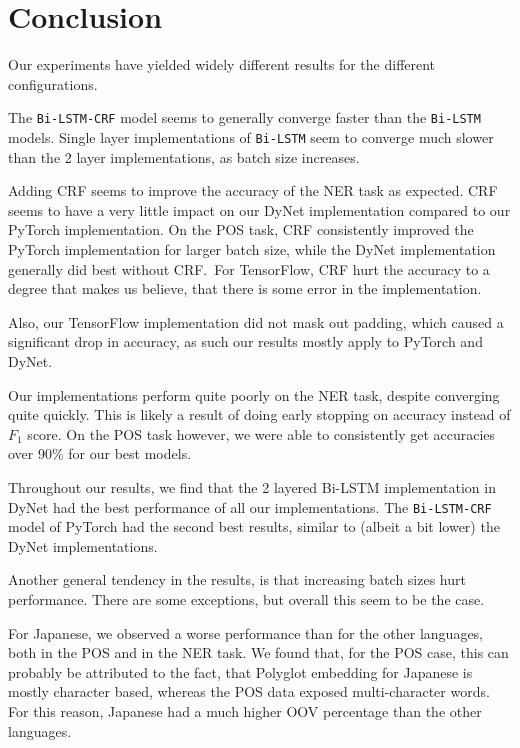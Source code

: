 

\section{Conclusion}

Our experiments have yielded widely different results for the different
configurations.

The \texttt{Bi-LSTM-CRF} model seems to generally converge faster than the
\texttt{Bi-LSTM} models. Single layer implementations of \texttt{Bi-LSTM}
seem to converge much slower than the 2 layer implementations, as batch size
increases.

Adding CRF seems to improve the accuracy of the NER task as expected. CRF seems
to have a very little impact on our DyNet implementation compared to our PyTorch
implementation. On the POS task, CRF consistently improved the PyTorch
implementation for larger batch size, while the DyNet implementation generally
did best without CRF.\ For TensorFlow, CRF hurt the accuracy to a degree that
makes us believe, that there is some error in the implementation.

Also, our TensorFlow implementation did not mask out padding, which caused a
significant drop in accuracy, as such our results mostly apply to PyTorch and
DyNet.

Our implementations perform quite poorly on the NER task, despite converging
quite quickly. This is likely a result of doing early stopping on accuracy
instead of $F_1$ score. On the POS task however, we were able to consistently
get accuracies over 90\% for our best models.

Throughout our results, we find that the 2 layered Bi-LSTM implementation in
DyNet had the best performance of all our implementations. The
\texttt{Bi-LSTM-CRF} model of PyTorch had the second best results, similar to
(albeit a bit lower) the DyNet implementations.

Another general tendency in the results, is that increasing batch sizes hurt
performance. There are some exceptions, but overall this seem to be the case.

For Japanese, we observed a worse performance than for the other languages, both
in the POS and in the NER task. We found that, for the POS case, this can
probably be attributed to the fact, that Polyglot embedding for Japanese is
mostly character based, whereas the POS data exposed multi-character words. For
this reason, Japanese had a much higher OOV percentage than the other languages.

